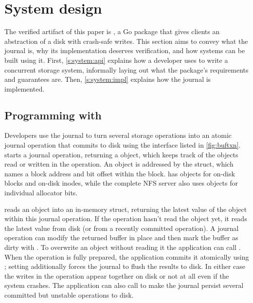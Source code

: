 \section{System design}
\label{s:system}

The verified artifact of this paper is \txn, a Go package that gives clients an
abstraction of a disk with crash-safe writes. This section aims to convey what
the journal is, why its implementation deserves verification, and how systems can be built
using it. First, \autoref{s:system:api} explains how a developer uses
\txn to write a concurrent storage system, informally laying out what the
package's requirements and guarantees are. Then,
\autoref{s:system:impl} explains how the journal is implemented.


\subsection{Programming with \txn}
\label{s:system:api}

Developers use the journal to turn several storage operations into an atomic journal operation that commits to disk using the \txn
interface listed in \autoref{fig:buftxn}.   starts a
journal operation, returning a  object, which keeps track of the
objects read or written in the operation.  An object is addressed by the
 struct, which names a block address and bit offset within the block. \simplenfs
has objects for on-disk blocks and on-disk inodes, while the
complete NFS server also uses objects for individual allocator bits.

 reads an object into an in-memory  struct, returning the latest value of the
object within this journal operation.  If the operation hasn't read the
object yet, it reads the latest value from disk (or from a recently
committed operation).  A journal operation can modify the returned buffer in place and
then mark the buffer as dirty with . To overwrite an object without
reading it the application can call . When the operation is
fully prepared, the application commits it atomically using ; setting
 additionally forces the journal to flush the results to disk.
In either case the writes in the operation appear together on disk or not at
all even if the system crashes. The application can also call  to
make the journal persist several committed but unstable operations to disk.

